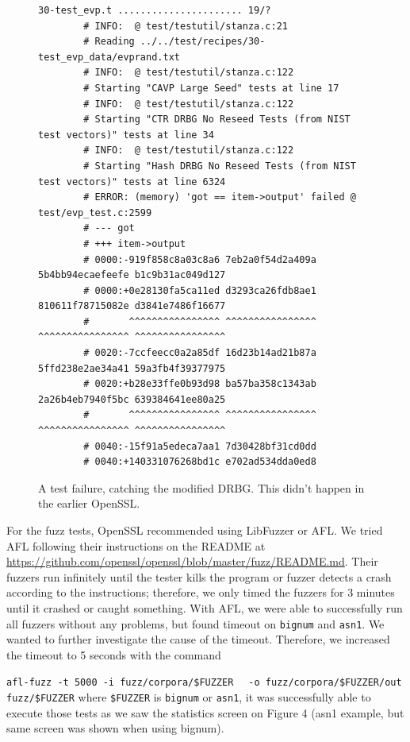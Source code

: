 \documentclass[conference]{IEEEtran}
\begin{document}
\begin{figure}[!t]

\centering
\begin{verbatim}
30-test_evp.t ...................... 19/? 
        # INFO:  @ test/testutil/stanza.c:21
        # Reading ../../test/recipes/30-test_evp_data/evprand.txt
        # INFO:  @ test/testutil/stanza.c:122
        # Starting "CAVP Large Seed" tests at line 17
        # INFO:  @ test/testutil/stanza.c:122
        # Starting "CTR DRBG No Reseed Tests (from NIST test vectors)" tests at line 34
        # INFO:  @ test/testutil/stanza.c:122
        # Starting "Hash DRBG No Reseed Tests (from NIST test vectors)" tests at line 6324
        # ERROR: (memory) 'got == item->output' failed @ test/evp_test.c:2599
        # --- got
        # +++ item->output
        # 0000:-919f858c8a03c8a6 7eb2a0f54d2a409a 5b4bb94ecaefeefe b1c9b31ac049d127
        # 0000:+0e28130fa5ca11ed d3293ca26fdb8ae1 810611f78715082e d3841e7486f16677
        #       ^^^^^^^^^^^^^^^^ ^^^^^^^^^^^^^^^^ ^^^^^^^^^^^^^^^^ ^^^^^^^^^^^^^^^^
        # 0020:-7ccfeecc0a2a85df 16d23b14ad21b87a 5ffd238e2ae34a41 59a3fb4f39377975
        # 0020:+b28e33ffe0b93d98 ba57ba358c1343ab 2a26b4eb7940f5bc 639384641ee80a25
        #       ^^^^^^^^^^^^^^^^ ^^^^^^^^^^^^^^^^ ^^^^^^^^^^^^^^^^ ^^^^^^^^^^^^^^^^
        # 0040:-15f91a5edeca7aa1 7d30428bf31cd0dd
        # 0040:+140331076268bd1c e702ad534dda0ed8
\end{verbatim}
\caption{A test failure, catching the modified DRBG. This didn't happen in the earlier OpenSSL.}
\label{testfailure}  
\end{figure}

  For the fuzz tests, OpenSSL recommended using LibFuzzer or AFL.
We tried AFL following their instructions on the README at \url{https://github.com/openssl/openssl/blob/master/fuzz/README.md}.
Their fuzzers run infinitely until the tester kills
the program or fuzzer detects a crash
according to the instructions; therefore, we only
timed the fuzzers for 3 minutes until it crashed or caught something. With
AFL, we were able to successfully run all
fuzzers without any problems, but 
found timeout on \verb|bignum| and \verb|asn1|. We wanted
to further investigate the cause of the timeout. Therefore, we increased 
the timeout to 5 seconds with the command 

\verb|afl-fuzz -t 5000 -i fuzz/corpora/$FUZZER|
\verb|  -o fuzz/corpora/$FUZZER/out fuzz/$FUZZER|
where \verb|$FUZZER| is \verb|bignum| or \verb|asn1|, it was successfully able to execute those tests
as we saw the statistics screen on Figure 4 (asn1 example, but same screen was shown
when using bignum). 
  
\end{document}
